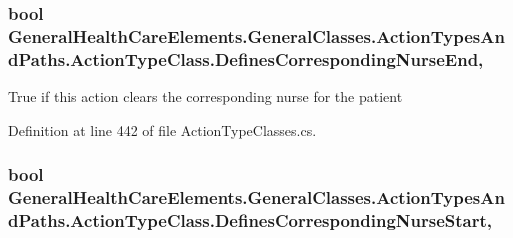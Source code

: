 \subsubsection[{\texorpdfstring{Defines\+Corresponding\+Nurse\+End}{DefinesCorrespondingNurseEnd}}]{\setlength{\rightskip}{0pt plus 5cm}bool General\+Health\+Care\+Elements.\+General\+Classes.\+Action\+Types\+And\+Paths.\+Action\+Type\+Class.\+Defines\+Corresponding\+Nurse\+End\hspace{0.3cm}{\ttfamily [get]}, {\ttfamily [set]}}\hypertarget{class_general_health_care_elements_1_1_general_classes_1_1_action_types_and_paths_1_1_action_type_class_a7a6a4a5903379718e8d1b91eb5d1880f}{}\label{class_general_health_care_elements_1_1_general_classes_1_1_action_types_and_paths_1_1_action_type_class_a7a6a4a5903379718e8d1b91eb5d1880f}


True if this action clears the corresponding nurse for the patient 



Definition at line 442 of file Action\+Type\+Classes.\+cs.

\subsubsection[{\texorpdfstring{Defines\+Corresponding\+Nurse\+Start}{DefinesCorrespondingNurseStart}}]{\setlength{\rightskip}{0pt plus 5cm}bool General\+Health\+Care\+Elements.\+General\+Classes.\+Action\+Types\+And\+Paths.\+Action\+Type\+Class.\+Defines\+Corresponding\+Nurse\+Start\hspace{0.3cm}{\ttfamily [get]}, {\ttfamily [set]}}\hypertarget{class_general_health_care_elements_1_1_general_classes_1_1_action_types_and_paths_1_1_action_type_class_acac7536b9438c790ab6d4e86b55c4bd4}{}\label{class_general_health_care_elements_1_1_general_classes_1_1_action_types_and_paths_1_1_action_type_class_acac7536b9438c790ab6d4e86b55c4bd4}


